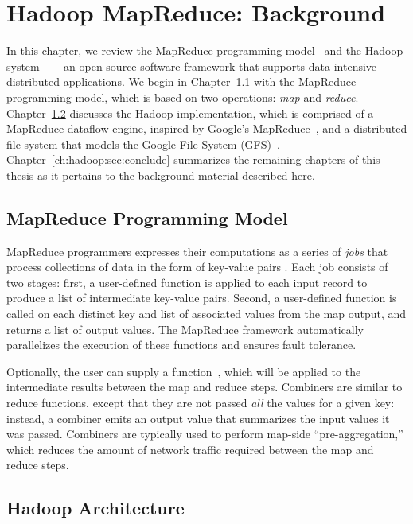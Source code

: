 \chapter[Hadoop MapReduce: Background]{Hadoop MapReduce: Background}
\label{ch:hadoop}

In this chapter, we review the MapReduce programming
model~\cite{mapreduce-osdi} and the Hadoop system~\cite{hadoop} --- an
open-source software framework that supports data-intensive distributed
applications.  We begin in Chapter~\ref{ch:hadoop:sec:progmodel} with the
MapReduce programming model, which is based on two operations: {\em map} and
{\em reduce}.  Chapter~\ref{ch:hadoop:sec:hadoop} discusses the Hadoop
implementation, which is comprised of a MapReduce dataflow engine, inspired by
Google's MapReduce~\cite{mapreduce-osdi}, and a distributed file system that
models the Google File System (GFS)~\cite{gfs-sosp}.
Chapter~\ref{ch:hadoop:sec:conclude} summarizes the remaining chapters of this
thesis as it pertains to the background material described here.

\section{MapReduce Programming Model}
\label{ch:hadoop:sec:progmodel}

MapReduce programmers expresses their computations as a series of {\em jobs}
that process collections of data in the form of key-value pairs . Each job
consists of two stages: first, a user-defined  function is applied to
each input record to produce a list of intermediate key-value pairs.  Second, a
user-defined  function is called on each distinct key and
list of associated values from the map output, and returns a list of output
values.  The MapReduce framework automatically parallelizes the execution of
these functions and ensures fault tolerance.

Optionally, the user can supply a 
function~\cite{mapreduce-osdi}, which will be applied to the intermediate
results between the map and reduce steps.  Combiners are similar to reduce
functions, except that they are not passed {\em all} the values for a given
key: instead, a combiner emits an output value that summarizes the input values
it was passed.  Combiners are typically used to perform map-side
``pre-aggregation,'' which reduces the amount of network traffic required
between the map and reduce steps.

\section{Hadoop Architecture}
\label{ch:hadoop:sec:hadoop}

